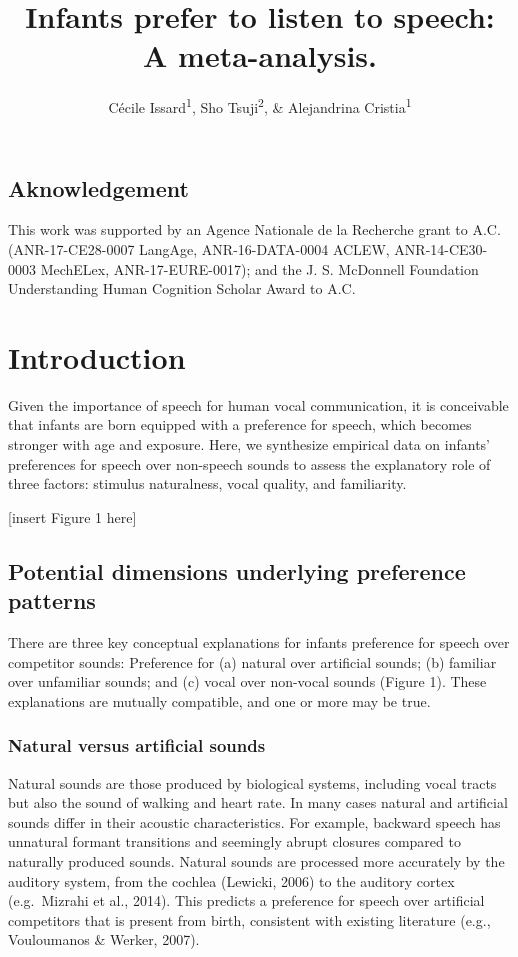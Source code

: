 \documentclass[man]{apa6}
\title{Infants prefer to listen to speech: A meta-analysis.}
\author{Cécile Issard\textsuperscript{1}, Sho Tsuji\textsuperscript{2}, \&
Alejandrina Cristia\textsuperscript{1}}
\date{}
\affiliation{
\vspace{0.5cm}
\textsuperscript{1} Laboratoire de Sciences Cognitives et Psycholinguistique, Ecole Normale Supérieure, Département d'Études Cognitives\\\textsuperscript{2} International Research Center for Neurointelligence, The University of Tokyo}
\begin{document}
\maketitle

\subsection{Aknowledgement}\label{aknowledgement}

This work was supported by an Agence Nationale de la Recherche grant to
A.C. (ANR-17-CE28-0007 LangAge, ANR-16-DATA-0004 ACLEW, ANR-14-CE30-0003
MechELex, ANR-17-EURE-0017); and the J. S. McDonnell Foundation
Understanding Human Cognition Scholar Award to A.C.

\section{Introduction}\label{introduction}

Given the importance of speech for human vocal communication, it is
conceivable that infants are born equipped with a preference for speech,
which becomes stronger with age and exposure. Here, we synthesize
empirical data on infants' preferences for speech over non-speech sounds
to assess the explanatory role of three factors: stimulus naturalness,
vocal quality, and familiarity.

{[}insert Figure 1 here{]}

\subsection{Potential dimensions underlying preference
patterns}\label{potential-dimensions-underlying-preference-patterns}

There are three key conceptual explanations for infants preference for
speech over competitor sounds: Preference for (a) natural over
artificial sounds; (b) familiar over unfamiliar sounds; and (c) vocal
over non-vocal sounds (Figure 1). These explanations are mutually
compatible, and one or more may be true.

\subsubsection{Natural versus artificial
sounds}\label{natural-versus-artificial-sounds}

Natural sounds are those produced by biological systems, including vocal
tracts but also the sound of walking and heart rate. In many cases
natural and artificial sounds differ in their acoustic characteristics.
For example, backward speech has unnatural formant transitions and
seemingly abrupt closures compared to naturally produced sounds. Natural
sounds are processed more accurately by the auditory system, from the
cochlea (Lewicki, 2006) to the auditory cortex (e.g.~Mizrahi et al.,
2014). This predicts a preference for speech over artificial competitors
that is present from birth, consistent with existing literature (e.g.,
Vouloumanos \& Werker, 2007).
\end{document}
